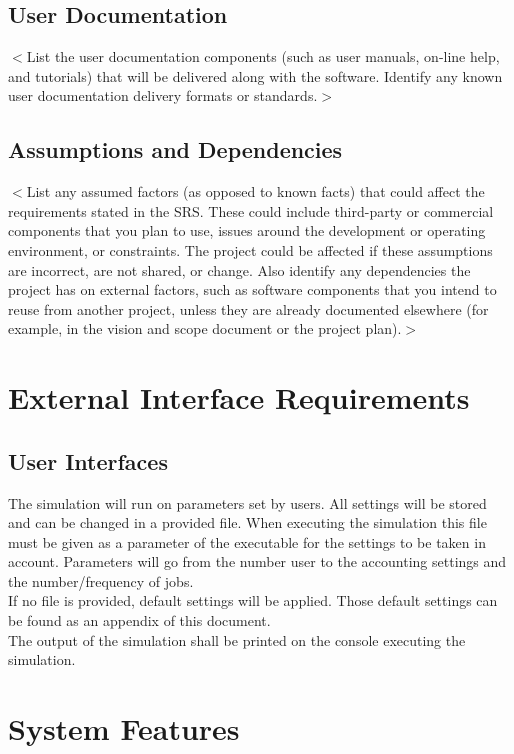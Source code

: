 \documentclass{scrreprt}
\begin{document}
\section{User Documentation}
$<$List the user documentation components (such as user manuals, on-line help, 
and tutorials) that will be delivered along with the software. Identify any 
known user documentation delivery formats or standards.$>$
\section{Assumptions and Dependencies}

$<$List any assumed factors (as opposed to known facts) that could affect the 
requirements stated in the SRS. These could include third-party or commercial 
components that you plan to use, issues around the development or operating 
environment, or constraints. The project could be affected if these assumptions 
are incorrect, are not shared, or change. Also identify any dependencies the 
project has on external factors, such as software components that you intend to 
reuse from another project, unless they are already documented elsewhere (for 
example, in the vision and scope document or the project plan).$>$


\chapter{External Interface Requirements}

\section{User Interfaces}
The simulation will run on parameters set by users. All settings will be stored and can be changed in a provided file. When executing the simulation this file must be given as a parameter of the executable for the settings to be taken in account. Parameters will go from the number user to the accounting settings and the number/frequency of jobs.\\
If no file is provided, default settings will be applied. Those default settings can be found as an appendix of this document.\\
The output of the simulation shall be printed on the console executing the simulation.


\chapter{System Features}
\end{document}
